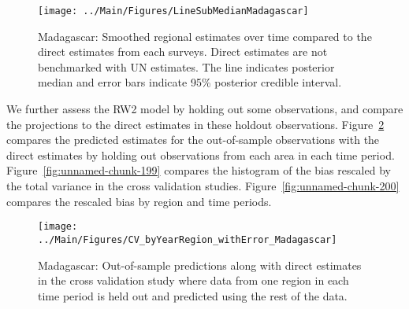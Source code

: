 \documentclass[12pt]{article}\usepackage[]{graphicx}\usepackage[]{color}
\newenvironment{knitrout}{}{} %
\begin{document}
\begin{knitrout}
\color{fgcolor}\begin{figure}[bht]

{\centering \texttt{[image: ../Main/Figures/LineSubMedianMadagascar]} 

}

\caption[Madagascar]{Madagascar: Smoothed regional estimates over time compared to the direct estimates from each surveys. Direct estimates are not benchmarked with UN estimates. The line indicates posterior median and error bars indicate 95\% posterior credible interval.}\label{fig:unnamed-chunk-197}
\end{figure}


\end{knitrout}
We further assess the RW2 model by holding out some observations, and compare the projections to the direct estimates in these holdout observations. Figure~\ref{fig:unnamed-chunk-198} compares the predicted estimates for the out-of-sample observations  with the direct estimates by holding out observations from each area in each time period.  Figure~\ref{fig:unnamed-chunk-199} compares the histogram of the bias rescaled by the total variance in the cross validation studies. Figure~\ref{fig:unnamed-chunk-200} compares the rescaled bias by region and time periods.



 
\begin{knitrout}
\color{fgcolor}\begin{figure}[bht]

{\centering \texttt{[image: ../Main/Figures/CV\_byYearRegion\_withError\_Madagascar]} 

}

\caption[Madagascar]{Madagascar: Out-of-sample predictions along with direct estimates in the cross validation study where data from one region in each time period is held out and predicted using the rest of the data.}\label{fig:unnamed-chunk-198}
\end{figure}


\end{knitrout}
\end{document}
